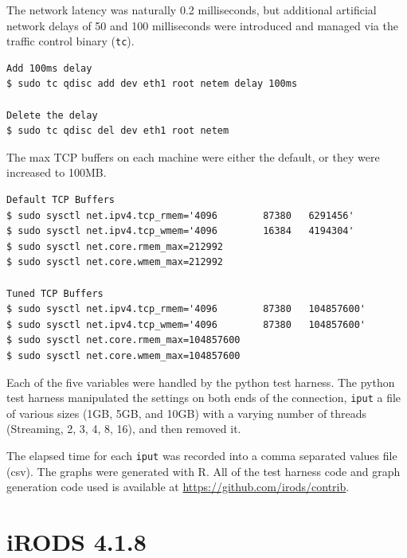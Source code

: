 \documentclass[letter, 11pt]{article}
\begin{document}
The network latency was naturally 0.2 milliseconds, but additional artificial network delays 
of 50 and 100 milliseconds were introduced and managed via the traffic control binary (\texttt{tc}).

\begin{lstlisting}
Add 100ms delay
$ sudo tc qdisc add dev eth1 root netem delay 100ms

Delete the delay
$ sudo tc qdisc del dev eth1 root netem
\end{lstlisting}

The max TCP buffers on each machine were either the default, or they were increased to 100MB.

\begin{lstlisting}
Default TCP Buffers
$ sudo sysctl net.ipv4.tcp_rmem='4096        87380   6291456'
$ sudo sysctl net.ipv4.tcp_wmem='4096        16384   4194304'
$ sudo sysctl net.core.rmem_max=212992
$ sudo sysctl net.core.wmem_max=212992

Tuned TCP Buffers
$ sudo sysctl net.ipv4.tcp_rmem='4096        87380   104857600'
$ sudo sysctl net.ipv4.tcp_wmem='4096        87380   104857600'
$ sudo sysctl net.core.rmem_max=104857600
$ sudo sysctl net.core.wmem_max=104857600
\end{lstlisting}

Each of the five variables were handled by the python test harness.  The python test harness
manipulated the settings on both ends of the connection, \texttt{iput} a file of various sizes
(1GB, 5GB, and 10GB) with a varying number of threads (Streaming, 2, 3, 4, 8, 16), and then removed it.

The elapsed time for each \texttt{iput} was recorded into a comma separated values file (csv). 
The graphs were generated with R.  All of the test harness code and graph generation code used
is available at \url{https://github.com/irods/contrib}.

\clearpage
\section{iRODS 4.1.8}
\end{document}
